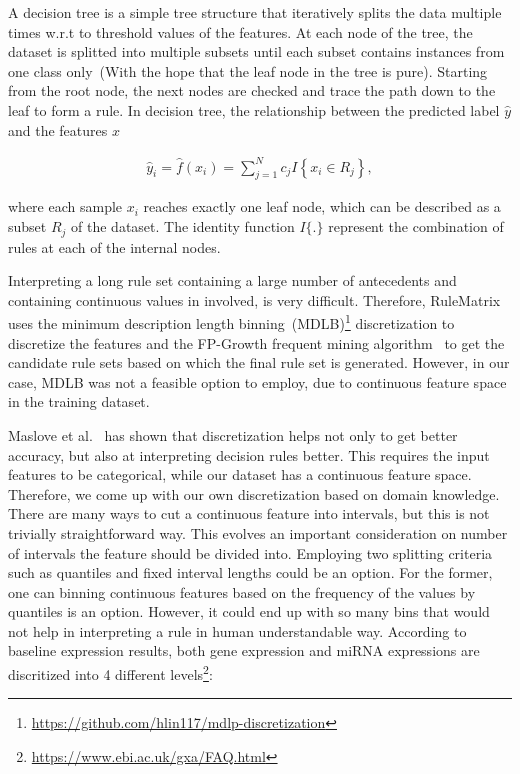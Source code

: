 \hspace*{3.5mm} A decision tree is a simple tree structure that iteratively splits the data multiple times w.r.t to threshold values of the features. At each node of the tree, the dataset is splitted into multiple subsets until each subset contains instances from one class only~(With the hope that the leaf node in the tree is pure). Starting from the root node, the next nodes are checked and trace the path down to the leaf to form a rule. In decision tree, the relationship between the predicted label $\hat{y}$ and the features $x$

\begin{align}
    \hat{y}_{i}=\hat{f}\left(x_{i}\right)=\sum_{j=1}^{N} c_{j} I\left\{x_{i} \in R_{j}\right\},
\end{align}

\hspace*{3.5mm} where each sample $x_{i}$ reaches exactly one leaf node, which can be described as a subset $R_{j}$ of the dataset. The identity function $I\{.\}$ represent the combination of rules at each of the internal nodes.

Interpreting a long rule set containing a large number of antecedents and containing continuous values in involved, is very difficult.  
Therefore, RuleMatrix uses the minimum description length binning~(MDLB)\footnote{\url{https://github.com/hlin117/mdlp-discretization}} discretization to discretize the features and the FP-Growth frequent mining algorithm~\cite{han2000mining} to get the candidate rule sets based on which the final rule set is generated. However, in our case, MDLB was not a feasible option to employ, due to continuous feature space in the training dataset. 

\hspace*{3.5mm} Maslove et al.~\cite{maslove2013discretization} has shown that discretization helps not only to get better accuracy, but also at interpreting  decision rules better. This requires the input features to be categorical, while our dataset has a continuous feature space. Therefore, we come up with our own discretization based on domain knowledge. There are many ways to cut a continuous feature into intervals, but this is not trivially straightforward way. This evolves an important consideration on number of intervals the feature should be divided into. Employing two splitting criteria such as quantiles and fixed interval lengths could be an option. For the former, one can binning continuous features based on the frequency of the values by quantiles is an option. However, it could end up with so many bins that would not help in interpreting a rule in human understandable way. 
According to baseline expression results, both gene expression and miRNA expressions are discritized into 4 different levels\footnote{\url{https://www.ebi.ac.uk/gxa/FAQ.html}}:

